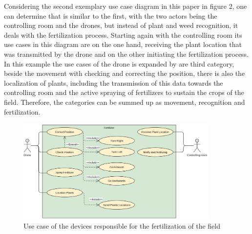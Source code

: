 \documentclass[english]{lni}
\begin{document}
Considering the second exemplary use case diagram in this paper in figure 2, one can determine that is similar to the first, with the two actors being the controlling room and the drones, but instead of plant and weed recognition, it deals with the fertilization process. Starting again with the controlling room its use cases in this diagram are on the one hand, receiving the plant location that was transmitted by the drone and on the other initiating the fertilization process. In this example the use cases of the drone is expanded by are third category, beside the movement with checking and correcting the position, there is also the localization of plants, including the transmission of this data towards the controlling room and the active spraying of fertilizers to sustain the crops of the field. Therefore, the categories can be summed up as movement, recognition and fertilization.

\begin{figure}[H]
    \centering
    \includegraphics[width = 10cm]{img/fertilizing_usecase.PNG}
    \caption{Use case of the devices responsible for the fertilization of the field}
    \label{fig:fertilizing_usecases}
\end{figure}
\end{document}
